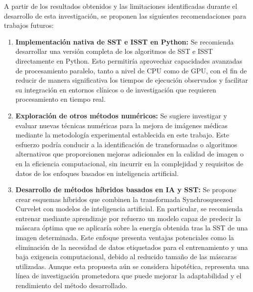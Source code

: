 \begin{recomendations}

    A partir de los resultados obtenidos y las limitaciones identificadas durante el desarrollo de esta investigación, se proponen las siguientes recomendaciones para trabajos futuros:

    \begin{enumerate}
    \item \textbf{Implementación nativa de SST e ISST en Python:} Se recomienda desarrollar una versión completa de los algoritmos de SST e ISST directamente en Python. Esto permitiría aprovechar capacidades avanzadas de procesamiento paralelo, tanto a nivel de CPU como de GPU, con el fin de reducir de manera significativa los tiempos de ejecución observados y facilitar su integración en entornos clínicos o de investigación que requieren procesamiento en tiempo real.

    \item \textbf{Exploración de otros métodos numéricos:} Se sugiere investigar y evaluar nuevas técnicas numéricas para la mejora de imágenes médicas mediante la metodología experimental establecida en este trabajo. Este esfuerzo podría conducir a la identificación de transformadas o algoritmos alternativos que proporcionen mejoras adicionales en la calidad de imagen o en la eficiencia computacional, sin incurrir en la complejidad y requisitos de datos de los enfoques basados en inteligencia artificial.

    \item \textbf{Desarrollo de métodos híbridos basados en IA y SST:} Se propone crear esquemas híbridos que combinen la transformada Synchrosqueezed Curvelet con modelos de inteligencia artificial. En particular, se recomienda entrenar mediante aprendizaje por refuerzo un modelo capaz de predecir la máscara óptima que se aplicaría sobre la energía obtenida tras la SST de una imagen determinada. Este enfoque presenta ventajas potenciales como la eliminación de la necesidad de datos etiquetados para el entrenamiento y una baja exigencia computacional, debido al reducido tamaño de las máscaras utilizadas. Aunque esta propuesta aún se considera hipotética, representa una línea de investigación prometedora que puede mejorar la adaptabilidad y el rendimiento del método desarrollado.
    \end{enumerate}
\end{recomendations}
